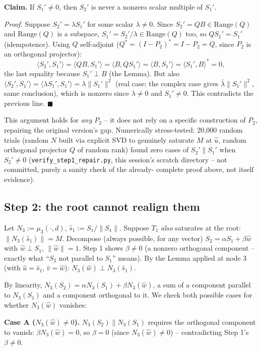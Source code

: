 \textbf{Claim.} If $S_1'\ne0$, then $S_2'$ is never a nonzero scalar
multiple of $S_1'$.

\textit{Proof.} Suppose $S_2'=\lambda S_1'$ for some scalar $\lambda\ne0$.
Since $S_2'=QB\in\mathrm{Range}(Q)$ and $\mathrm{Range}(Q)$ is a subspace,
$S_1'=S_2'/\lambda\in\mathrm{Range}(Q)$ too, so $QS_1'=S_1'$ (idempotence).
Using $Q$ self-adjoint ($Q^*=(I-P_2)^*=I-P_2=Q$, since $P_2$ is an
orthogonal projector):
\[
  \langle S_2',S_1'\rangle = \langle QB,S_1'\rangle = \langle B,QS_1'\rangle
  = \langle B,S_1'\rangle = \langle S_1',B\rangle^* = 0,
\]
the last equality because $S_1'\perp B$ (the Lemma). But also
$\langle S_2',S_1'\rangle=\langle\lambda S_1',S_1'\rangle=\lambda\|S_1'\|^2$
(real case; the complex case gives $\bar\lambda\|S_1'\|^2$, same
conclusion), which is nonzero since $\lambda\ne0$ and $S_1'\ne0$. This
contradicts the previous line. $\blacksquare$

This argument holds for \emph{any} $P_2$ -- it does not rely on a
specific construction of $P_2$, repairing the original version's gap.
Numerically stress-tested: 20{,}000 random trials (random $N$ built via
explicit SVD to genuinely saturate $M$ at $\hat u$, random orthogonal
projector $Q$ of random rank) found zero cases of $S_2'\parallel S_1'$
when $S_2'\ne0$ (\texttt{verify\_step1\_repair.py}, this session's
scratch directory -- not committed, purely a sanity check of the already-
complete proof above, not itself evidence).

\subsection*{Step 2: the root cannot realign them}

Let $N_3:=\mu_3(\cdot,d)$, $\hat s_1:=S_1/\|S_1\|$. Suppose $T_1$
\emph{also} saturates at the root: $\|N_3(\hat s_1)\|=M$. Decompose
(always possible, for any vector) $S_2=\alpha S_1+\beta\hat w$ with
$\hat w\perp S_1$, $\|\hat w\|=1$. Step 1 shows $\beta\ne0$ (a nonzero
orthogonal component -- exactly what ``$S_2$ not parallel to $S_1$''
means). By the Lemma applied at node 3 (with $\hat u=\hat s_1$,
$\hat v=\hat w$): $N_3(\hat w)\perp N_3(\hat s_1)$.

By linearity, $N_3(S_2)=\alpha N_3(S_1)+\beta N_3(\hat w)$, a sum of a
component parallel to $N_3(S_1)$ and a component orthogonal to it. We
check both possible cases for whether $N_3(\hat w)$ vanishes:

\textbf{Case A ($N_3(\hat w)\ne0$).} $N_3(S_2)\parallel N_3(S_1)$ requires
the orthogonal component to vanish: $\beta N_3(\hat w)=0$, so $\beta=0$
(since $N_3(\hat w)\ne0$) -- contradicting Step 1's $\beta\ne0$.

